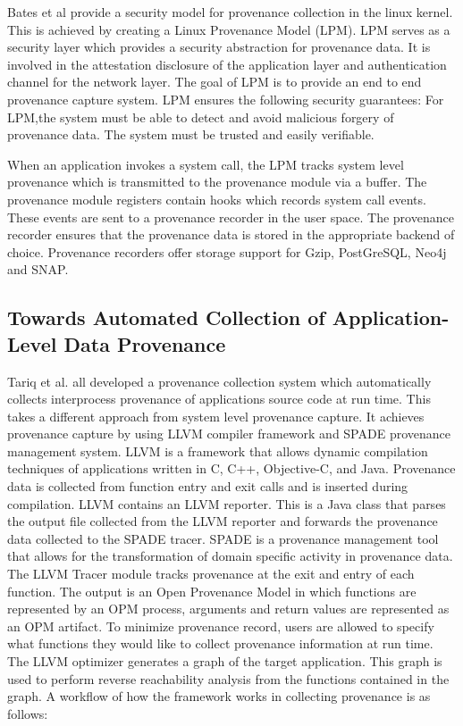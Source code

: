 Bates et al \cite{bates_towards_2013} provide a security model for provenance collection in the linux kernel. This is achieved by creating a Linux Provenance Model (LPM). LPM serves as a security layer which provides a security abstraction for provenance data. It is involved in the attestation disclosure of the application layer and authentication channel for the network layer. The goal of LPM is to provide an end to end provenance capture system. LPM ensures the following security guarantees: For LPM,the system must be able to detect and avoid malicious forgery of provenance data. The system must be trusted and easily verifiable. \par When an application invokes a system call, the LPM tracks system level provenance which is transmitted to the provenance module via a buffer. The provenance module registers contain hooks which records system call events. These events are sent to a provenance recorder in the user space. The provenance recorder ensures that the provenance data is stored in the appropriate backend of choice. Provenance recorders offer storage support for Gzip, PostGreSQL, Neo4j and SNAP.



\subsection{Towards Automated Collection of Application-Level Data Provenance}
Tariq et al. \cite{tariq_towards_2012} all developed a provenance collection system which automatically collects interprocess provenance of applications source code at run time. This takes a different approach from system level provenance capture. It achieves provenance capture by using LLVM compiler framework and SPADE provenance management system. LLVM is a framework that allows dynamic compilation techniques of applications written in C, C++, Objective-C, and Java. Provenance data is collected from function entry and exit calls and is inserted during compilation. LLVM contains an LLVM reporter. This is a Java class that parses the output file collected from the LLVM reporter and forwards the provenance data collected to the SPADE tracer. SPADE is a provenance management tool that allows for the transformation of domain specific activity in provenance data. The LLVM Tracer module tracks provenance at the exit and entry of each function. The output is an Open Provenance Model in which functions are represented by an OPM process, arguments and return values are represented as an OPM artifact. To minimize provenance record, users are allowed to specify what functions they would like to collect provenance information at run time. The LLVM optimizer generates a graph of the target application. This graph is used to perform reverse reachability analysis  from the functions contained in the graph. A workflow of how the framework works in collecting provenance is as follows:

